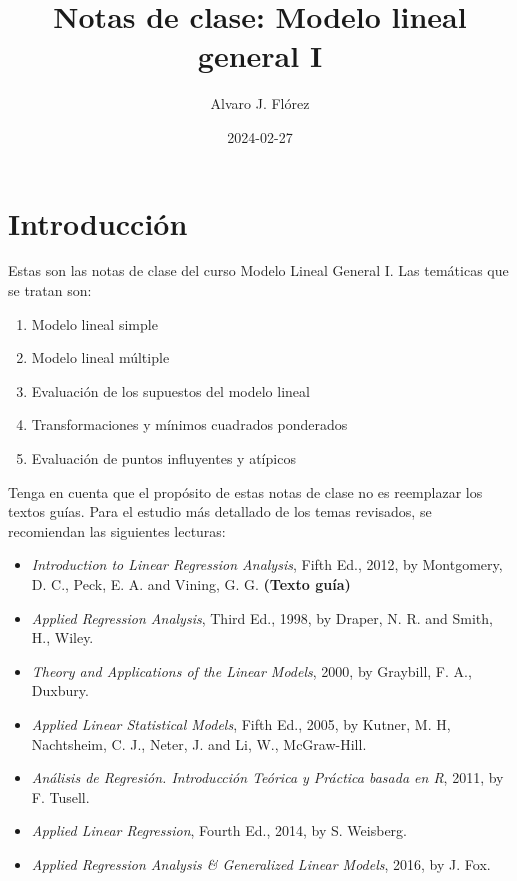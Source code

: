 \documentclass[
]{article}
\title{Notas de clase: Modelo lineal general I}
\author{Alvaro J. Flórez}
\date{2024-02-27}
\providecommand{\tightlist}{%
  \setlength{\itemsep}{0pt}\setlength{\parskip}{0pt}}
\begin{document}
\maketitle

{
\setcounter{tocdepth}{2}
\tableofcontents
}
\hypertarget{introducciuxf3n}{%
\section*{Introducción}\label{introducciuxf3n}}

Estas son las notas de clase del curso Modelo Lineal General I. Las temáticas que se tratan son:

\begin{enumerate}
\def\labelenumi{\arabic{enumi}.}
\tightlist
\item
  Modelo lineal simple
\item
  Modelo lineal múltiple
\item
  Evaluación de los supuestos del modelo lineal
\item
  Transformaciones y mínimos cuadrados ponderados
\item
  Evaluación de puntos influyentes y atípicos
\end{enumerate}

Tenga en cuenta que el propósito de estas notas de clase no es reemplazar los textos guías. Para el estudio más detallado de los temas revisados, se recomiendan las siguientes lecturas:

\begin{itemize}
\tightlist
\item
  \emph{Introduction to Linear Regression Analysis}, Fifth Ed., 2012, by Montgomery, D. C., Peck, E. A. and Vining, G. G. \textbf{(Texto guía)}
\item
  \emph{Applied Regression Analysis}, Third Ed., 1998, by Draper, N. R. and Smith, H., Wiley.
\item
  \emph{Theory and Applications of the Linear Models}, 2000, by Graybill, F. A., Duxbury.
\item
  \emph{Applied Linear Statistical Models}, Fifth Ed., 2005, by Kutner, M. H, Nachtsheim, C. J., Neter, J. and Li, W., McGraw-Hill.
\item
  \emph{Análisis de Regresión. Introducción Teórica y Práctica basada en R}, 2011, by F. Tusell.
\item
  \emph{Applied Linear Regression}, Fourth Ed., 2014, by S. Weisberg.
\item
  \emph{Applied Regression Analysis \& Generalized Linear Models}, 2016, by J. Fox.
\end{itemize}
\end{document}
